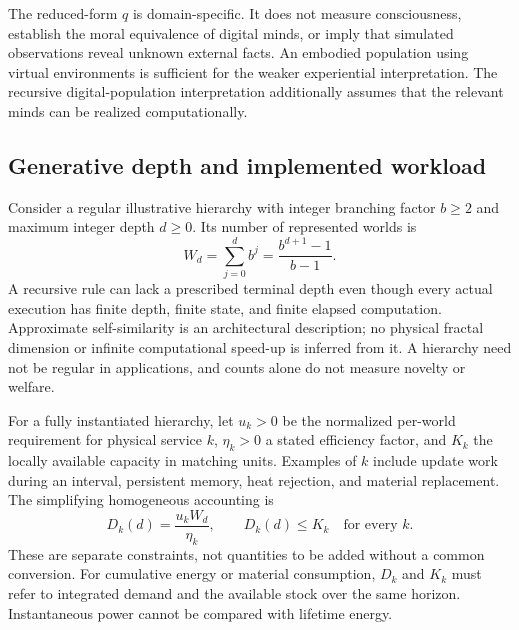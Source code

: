 The reduced-form $q$ is domain-specific. It does not measure consciousness, establish the moral equivalence of digital minds, or imply that simulated observations reveal unknown external facts. An embodied population using virtual environments is sufficient for the weaker experiential interpretation. The recursive digital-population interpretation additionally assumes that the relevant minds can be realized computationally.

\subsection{Generative depth and implemented workload}

Consider a regular illustrative hierarchy with integer branching factor $b\geq2$ and maximum integer depth $d\geq0$. Its number of represented worlds is
\begin{equation}
 W_d=\sum_{j=0}^{d}b^j=\frac{b^{d+1}-1}{b-1}.
 \label{eq:worlds}
\end{equation}
A recursive rule can lack a prescribed terminal depth even though every actual execution has finite depth, finite state, and finite elapsed computation. Approximate self-similarity is an architectural description; no physical fractal dimension or infinite computational speed-up is inferred from it. A hierarchy need not be regular in applications, and counts alone do not measure novelty or welfare.

For a fully instantiated hierarchy, let $u_k>0$ be the normalized per-world requirement for physical service $k$, $\eta_k>0$ a stated efficiency factor, and $K_k$ the locally available capacity in matching units. Examples of $k$ include update work during an interval, persistent memory, heat rejection, and material replacement. The simplifying homogeneous accounting is
\begin{equation}
 D_k(d)=\frac{u_kW_d}{\eta_k},\qquad D_k(d)\leq K_k\quad\text{for every }k.
 \label{eq:resource}
\end{equation}
These are separate constraints, not quantities to be added without a common conversion. For cumulative energy or material consumption, $D_k$ and $K_k$ must refer to integrated demand and the available stock over the same horizon. Instantaneous power cannot be compared with lifetime energy.

